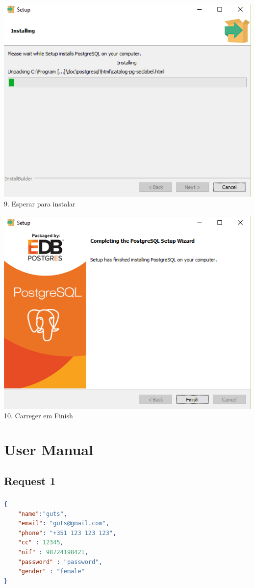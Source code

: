 \documentclass[a4paper, 11pt]{article}
\begin{document}
\begin{minipage}{0.45\textwidth}
  \includegraphics[width=\textwidth]{Screenshot-830.png}
  9. Esperar para instalar
\end{minipage}\hfill
\begin{minipage}{0.45\textwidth}
  \includegraphics[width=\textwidth]{Screenshot-937.png}
  10. Carreger em Finish
\end{minipage}



\section{User Manual}

\subsection{Request 1}
\vspace{1em}

\subsubsection{}
\begin{lstlisting}[language=json]
{
    "name":"guts",
    "email": "guts@gmail.com",
    "phone": "+351 123 123 123",
    "cc" : 12345,
    "nif" : 98724198421,
    "password" : "password", 
    "gender" : "female"
}
\end{lstlisting}
\end{document}
